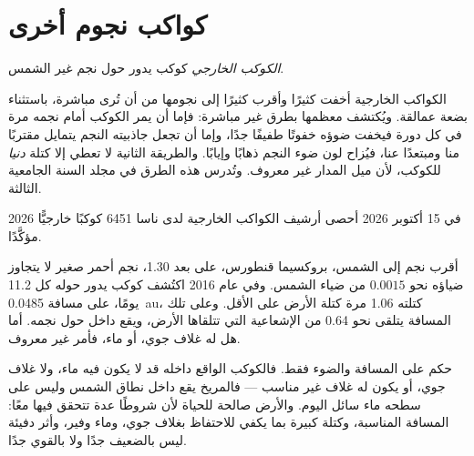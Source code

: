 \section{كواكب نجوم أخرى}

\begin{definition}\label{def:g10:habitable-planet:exoplanet}
\emph{الكوكب الخارجي} كوكب يدور حول نجم غير
الشمس.
\end{definition}

الكواكب الخارجية أخفت كثيرًا وأقرب كثيرًا إلى نجومها من أن تُرى مباشرة، باستثناء
بضعة عمالقة. ويُكتشف معظمها بطرق غير مباشرة: فإما أن يمر الكوكب أمام نجمه مرة
في كل دورة فيخفت ضوؤه خفوتًا طفيفًا جدًا، وإما أن تجعل جاذبيته النجم يتمايل
مقتربًا منا ومبتعدًا عنا، فيُزاح لون ضوء النجم ذهابًا وإيابًا. والطريقة الثانية
لا تعطي إلا كتلة \emph{دنيا} للكوكب، لأن ميل المدار غير معروف. وتُدرس هذه
الطرق في مجلد السنة الجامعية الثالثة.

\begin{dated}{2026}
في 15 أكتوبر 2026 أحصى أرشيف الكواكب الخارجية لدى ناسا \num{6451} كوكبًا
خارجيًّا مؤكَّدًا.
\end{dated}

\begin{example}[بروكسيما ب]\label{ex:g10:habitable-planet:proxima}
أقرب نجم إلى الشمس، بروكسيما قنطورس، على بعد \qty{1.30}{\parsec}، نجم أحمر
صغير لا يتجاوز ضياؤه نحو $0.0015$ من ضياء الشمس. وفي عام 2016 اكتُشف كوكب
يدور حوله كل 11.2 يومًا، على مسافة \qty{0.0485}{au}، كتلته 1.06 مرة كتلة الأرض
على الأقل. وعلى تلك المسافة يتلقى نحو 0.64 من الإشعاعية التي تتلقاها الأرض،
ويقع داخل  حول نجمه. أما هل له غلاف جوي، أو ماء، فأمر غير
معروف.
\end{example}

\begin{remark}\label{rem:g10:habitable-planet:inhabited}
 حكم على المسافة والضوء فقط. فالكوكب الواقع داخله قد لا
يكون فيه ماء، ولا غلاف جوي، أو يكون له غلاف غير مناسب --- فالمريخ يقع داخل نطاق
الشمس وليس على سطحه ماء سائل اليوم. والأرض صالحة للحياة لأن شروطًا عدة تتحقق
فيها معًا: المسافة المناسبة، وكتلة كبيرة بما يكفي للاحتفاظ بغلاف جوي، وماء
وفير، وأثر دفيئة ليس بالضعيف جدًا ولا بالقوي جدًا.
\end{remark}

